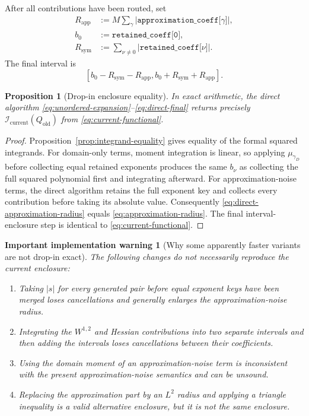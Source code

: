 \documentclass[11pt]{article}
\newtheorem{proposition}{Proposition}
\newtheorem{warning}{Important implementation warning}
\newcommand{\abs}[1]{\left\lvert #1\right\rvert}
\begin{document}
After all contributions have been routed, set
\begin{align}
    R_{\mathrm{app}}
    &:=
    M\sum_{\gamma}
        \abs{\texttt{approximation\_coeff[\(\gamma\)]}},
    \label{eq:direct-approximation-radius}\\
    b_0
    &:=
    \texttt{retained\_coeff[0]},\\
    R_{\mathrm{sym}}
    &:=
    \sum_{\nu\neq0}
        \abs{\texttt{retained\_coeff[\(\nu\)]}}.
    \label{eq:direct-symbolic-radius}
\end{align}
The final interval is
\begin{equation}
    \boxed{
    [b_0-R_{\mathrm{sym}}-R_{\mathrm{app}},
     b_0+R_{\mathrm{sym}}+R_{\mathrm{app}}].
    }
    \label{eq:direct-final}
\end{equation}

\begin{proposition}[Drop-in enclosure equality]
\label{prop:enclosure-equality}
In exact arithmetic, the direct algorithm
\eqref{eq:unordered-expansion}--\eqref{eq:direct-final} returns precisely
\(\mathcal{I}_{\mathrm{current}}(Q_{\mathrm{old}})\) from
\eqref{eq:current-functional}.
\end{proposition}

\begin{proof}
Proposition~\ref{prop:integrand-equality} gives equality of the formal squared
integrands.  For domain-only terms, moment integration is linear, so applying
\(\mu_{\gamma_D}\) before collecting equal retained exponents produces the same
\(b_\nu\) as collecting the full squared polynomial first and integrating
afterward.  For approximation-noise terms, the direct algorithm retains the full exponent
key and collects every contribution before taking its absolute value.
Consequently \eqref{eq:direct-approximation-radius} equals
\eqref{eq:approximation-radius}.  The final interval-enclosure step is identical to
\eqref{eq:current-functional}.
\end{proof}

\begin{warning}[Why some apparently faster variants are not drop-in exact]
The following changes do not necessarily reproduce the current enclosure:
\begin{enumerate}[label=\arabic*.]
    \item Taking \(\abs{s}\) for every generated pair before equal exponent
    keys have been merged loses cancellations and generally enlarges the
    approximation-noise radius.
    \item Integrating the \(W^{1,2}\) and Hessian contributions into two
    separate intervals and then adding the intervals loses cancellations
    between their coefficients.
    \item Using the domain moment of an approximation-noise term is inconsistent
    with the present approximation-noise semantics and can be unsound.
    \item Replacing the approximation part by an \(L^2\) radius and applying a
    triangle inequality is a valid alternative enclosure, but it is not the
    same enclosure.
\end{enumerate}
\end{warning}
\end{document}
